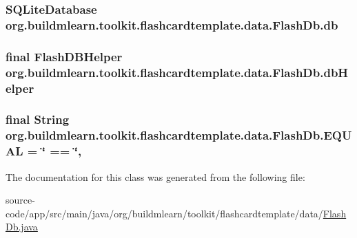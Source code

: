 \subsubsection[{\texorpdfstring{db}{db}}]{\setlength{\rightskip}{0pt plus 5cm}S\+Q\+Lite\+Database org.\+buildmlearn.\+toolkit.\+flashcardtemplate.\+data.\+Flash\+Db.\+db\hspace{0.3cm}{\ttfamily [private]}}\hypertarget{classorg_1_1buildmlearn_1_1toolkit_1_1flashcardtemplate_1_1data_1_1FlashDb_ada89a6b25f8c22594bf09f8e7b4ae0e4}{}\label{classorg_1_1buildmlearn_1_1toolkit_1_1flashcardtemplate_1_1data_1_1FlashDb_ada89a6b25f8c22594bf09f8e7b4ae0e4}
\subsubsection[{\texorpdfstring{db\+Helper}{dbHelper}}]{\setlength{\rightskip}{0pt plus 5cm}final Flash\+D\+B\+Helper org.\+buildmlearn.\+toolkit.\+flashcardtemplate.\+data.\+Flash\+Db.\+db\+Helper\hspace{0.3cm}{\ttfamily [private]}}\hypertarget{classorg_1_1buildmlearn_1_1toolkit_1_1flashcardtemplate_1_1data_1_1FlashDb_ae21d788ab58332f36740310ea2275fd5}{}\label{classorg_1_1buildmlearn_1_1toolkit_1_1flashcardtemplate_1_1data_1_1FlashDb_ae21d788ab58332f36740310ea2275fd5}
\subsubsection[{\texorpdfstring{E\+Q\+U\+AL}{EQUAL}}]{\setlength{\rightskip}{0pt plus 5cm}final String org.\+buildmlearn.\+toolkit.\+flashcardtemplate.\+data.\+Flash\+Db.\+E\+Q\+U\+AL = \char`\"{} == \char`\"{}\hspace{0.3cm}{\ttfamily [static]}, {\ttfamily [private]}}\hypertarget{classorg_1_1buildmlearn_1_1toolkit_1_1flashcardtemplate_1_1data_1_1FlashDb_a25c392106b62a25f8dc98c8059891411}{}\label{classorg_1_1buildmlearn_1_1toolkit_1_1flashcardtemplate_1_1data_1_1FlashDb_a25c392106b62a25f8dc98c8059891411}


The documentation for this class was generated from the following file\+:\begin{DoxyCompactItemize}
\item 
source-\/code/app/src/main/java/org/buildmlearn/toolkit/flashcardtemplate/data/\hyperlink{FlashDb_8java}{Flash\+Db.\+java}\end{DoxyCompactItemize}
